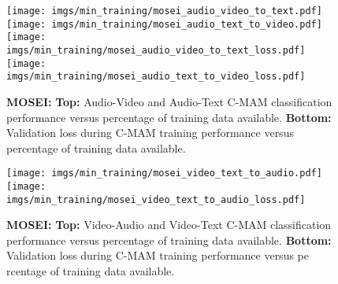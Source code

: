 \begin{figure}[h!]

    \texttt{[image: imgs/min\_training/mosei\_audio\_video\_to\_text.pdf]}
    \texttt{[image: imgs/min\_training/mosei\_audio\_text\_to\_video.pdf]} 
    \texttt{[image: imgs/min\_training/mosei\_audio\_video\_to\_text\_loss.pdf]}
    \texttt{[image: imgs/min\_training/mosei\_audio\_text\_to\_video\_loss.pdf]} 
    \caption{\textbf{MOSEI:} \textbf{Top:} Audio-Video and Audio-Text C-MAM classification performance versus percentage of training data available. \textbf{Bottom:} Validation loss during C-MAM training performance versus percentage of training data available.}
    \label{fig:mosei_min_training_five}

\end{figure}


\begin{figure}[b!]
    \texttt{[image: imgs/min\_training/mosei\_video\_text\_to\_audio.pdf]}
    \texttt{[image: imgs/min\_training/mosei\_video\_text\_to\_audio\_loss.pdf]}
    \caption{\textbf{MOSEI:} \textbf{Top:} Video-Audio and Video-Text C-MAM classification performance versus percentage of training data available. \textbf{Bottom:} Validation loss during C-MAM training performance versus pe                                              rcentage of training data available.}
    \label{fig:mosei_min_training_six}
\end{figure}


\FloatBarrier